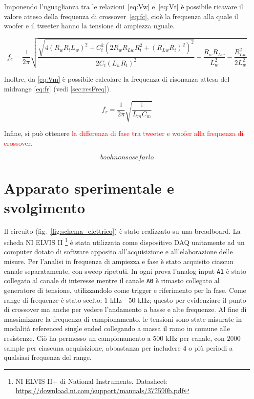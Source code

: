 \documentclass[12pt,italian]{article}
\newcommand{\err}[1]{\textcolor{red}{#1}}
\begin{document}
Imponendo l'uguaglianza tra le relazioni~\eqref{eq:Vw} e~\eqref{eq:Vt} è
possibile ricavare il valore atteso della frequenza di crossover~\eqref{eq:fc},
cioè la frequenza alla quale il woofer e il tweeter hanno la tensione di
ampiezza uguale.

\begin{equation}
	f_{c} = \frac{1}{2\pi}\sqrt{\frac{\sqrt{4 (R_{w} R_{t} L_{w})^2 + C_{t}^2(2
				R_{w} R_{Lw} R_{t}^2 + (R_{Lw} R_{t})^2)^2}}{2 C _{t} (L_{w} R_{t})^2 } -
		\frac{R_{w} R_{Lw}}{L_{w}^2} - \frac{R_{Lw}^2}{2 L_{w}^2}}
	\label{eq:fc}
\end{equation}

\noindent
Inoltre, da \eqref{eq:Vm} è possibile calcolare la frequenza di risonanza attesa del midrange \eqref{eq:fr} (vedi \cref{sec:resFreq}).

\begin{equation}
	f_{r} = \frac{1}{2\pi}\sqrt{\frac{1}{L_{m} C_{m}}}  %
	\label{eq:fr}
\end{equation}

\noindent
Infine, si può ottenere \err{la differenza di fase tra tweeter e woofer alla frequenza di crossover}.

\begin{equation}
	booh non so se farlo
\end{equation}

\section*{Apparato sperimentale e svolgimento}

Il circuito (fig.~\ref{fig:schema_elettrico}) è stato realizzato su una
breadboard. La scheda NI ELVIS II \footnote{NI ELVIS II+ di National
	Instruments. Datasheet:
	\url{https://download.ni.com/support/manuals/372590b.pdf}} è stata utilizzata
come dispositivo DAQ unitamente ad un computer dotato di software apposito
all'acquisizione e all'elaborazione delle misure. Per l'analisi in frequenza di
ampiezza e fase è stato acquisito ciascun canale separatamente, con sweep
ripetuti. In ogni prova l'analog input \texttt{A1} è stato collegato al canale
di interesse mentre il canale \texttt{A0} è rimasto collegato al generatore di
tensione, utilizzandolo come trigger e riferimento per la fase. Come range di
frequenze è stato scelto: $1$ kHz - $50$ kHz; questo per evidenziare il punto
di crossover ma anche per vedere l'andamento a basse e alte frequenze. Al fine
di massimizzare la frequenza di campionamento, le tensioni sono state misurate
in modalità referenced single ended collegando a massa il ramo in comune alle
resistenze. Ciò ha permesso un campionamento a $500$ kHz per canale, con $2000$
sample per ciascuna acquisizione, abbastanza per includere $4$ o più periodi a
qualsiasi frequenza del range.
\end{document}
